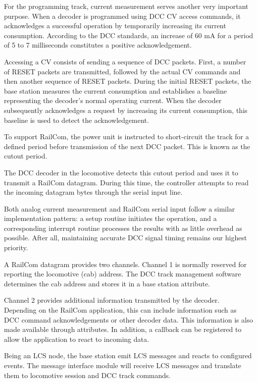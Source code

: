 For the programming track, current measurement serves another very important purpose.
When a decoder is programmed using DCC CV access commands, it acknowledges a successful operation by temporarily increasing its current consumption. According to the DCC standards, an increase of 60 mA for a period of 5 to 7 milliseconds constitutes a positive acknowledgement.

Accessing a CV consists of sending a sequence of DCC packets. First, a number of RESET packets are transmitted, followed by the actual CV commands and then another sequence of RESET packets.
During the initial RESET packets, the base station measures the current consumption and establishes a baseline representing the decoder’s normal operating current. When the decoder subsequently acknowledges a request by increasing its current consumption, this baseline is used to detect the acknowledgement.


To support RailCom, the power unit is instructed to short-circuit the track for a defined period before transmission of the next DCC packet. This is known as the cutout period.

The DCC decoder in the locomotive detects this cutout period and uses it to transmit a RailCom datagram. During this time, the controller attempts to read the incoming datagram bytes through the serial input line.

Both analog current measurement and RailCom serial input follow a similar implementation pattern: a setup routine initiates the operation, and a corresponding interrupt routine processes the results with as little overhead as possible. After all, maintaining accurate DCC signal timing remains our highest priority.

A RailCom datagram provides two channels. Channel 1 is normally reserved for reporting the locomotive (cab) address. The DCC track management software determines the cab address and stores it in a base station attribute.

Channel 2 provides additional information transmitted by the decoder. Depending on the RailCom application, this can include information such as DCC command acknowledgements or other decoder data. This information is also made available through attributes. In addition, a callback can be registered to allow the application to react to incoming data.


Being an LCS node, the base station emit LCS messages and reacts to configured events. The message interface module will receive LCS messages and translate them to locomotive session and DCC track commands. 

